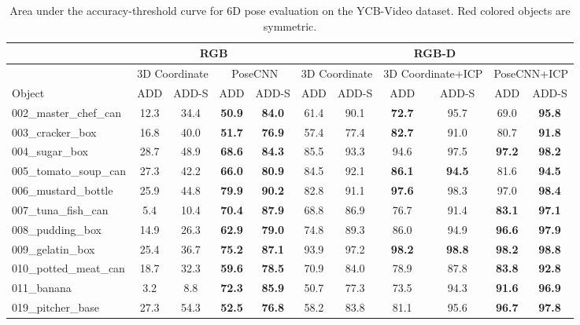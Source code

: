 \documentclass[conference]{IEEEtran}
\begin{document}
\begin{table*}
	\centering
	\caption{Area under the accuracy-threshold curve for 6D pose evaluation on the YCB-Video dataset. Red colored objects are symmetric.}
	\label{table:ycb}
	\begin{tabular}{|l|c|c|c|c||c|c|c|c|c|c|}
		\hline  & \multicolumn{4}{c||}{RGB} & \multicolumn{6}{c|}{RGB-D} \\
		\hline  & \multicolumn{2}{c|}{3D Coordinate}  & \multicolumn{2}{c||}{PoseCNN} & \multicolumn{2}{c|}{3D Coordinate} & \multicolumn{2}{c|}{3D Coordinate+ICP} & \multicolumn{2}{c|}{PoseCNN+ICP} \\
		\hline  Object & ADD & ADD-S & ADD & ADD-S & ADD & ADD-S & ADD  & ADD-S & ADD & ADD-S \\
		\hline 002\_master\_chef\_can & 12.3 & 34.4 &	\textbf{50.9} & \textbf{84.0} & 61.4 & 90.1  & \textbf{72.7} & 95.7 & 69.0 & \textbf{95.8} \\
		\hline 003\_cracker\_box & 16.8 & 40.0 & \textbf{51.7} & \textbf{76.9} & 57.4 & 77.4 & \textbf{82.7} & 91.0  & 80.7 & \textbf{91.8} \\
		\hline 004\_sugar\_box & 28.7 & 48.9 & \textbf{68.6} & \textbf{84.3} & 85.5 & 93.3 & 94.6 & 97.5 & \textbf{97.2} & \textbf{98.2} \\
		\hline 005\_tomato\_soup\_can & 27.3 & 42.2 &	\textbf{66.0} & \textbf{80.9} & 84.5 & 92.1 &	\textbf{86.1} & \textbf{94.5} & 81.6 & \textbf{94.5} \\
		\hline 006\_mustard\_bottle & 25.9 & 44.8 & \textbf{79.9} & \textbf{90.2} & 82.8 & 91.1 & \textbf{97.6} & 98.3 & 97.0 & \textbf{98.4} \\
		\hline 007\_tuna\_fish\_can & 5.4 & 10.4 & \textbf{70.4} & \textbf{87.9} & 68.8 & 86.9 & 76.7 & 91.4 & \textbf{83.1} & \textbf{97.1} \\
		\hline 008\_pudding\_box & 14.9 & 26.3 & \textbf{62.9} & \textbf{79.0} & 74.8 & 89.3 & 86.0 & 94.9 & \textbf{96.6} & \textbf{97.9} \\
		\hline 009\_gelatin\_box & 25.4 & 36.7 & \textbf{75.2} & \textbf{87.1} & 93.9 & 97.2 & \textbf{98.2} & \textbf{98.8} & \textbf{98.2} & \textbf{98.8} \\
		\hline 010\_potted\_meat\_can & 18.7 & 32.3 & \textbf{59.6} & \textbf{78.5} & 70.9 & 84.0 & 78.9 & 87.8 & \textbf{83.8} & \textbf{92.8} \\
		\hline 011\_banana & 3.2 & 8.8 & \textbf{72.3} & \textbf{85.9} & 50.7 & 77.3 & 73.5 & 94.3 & \textbf{91.6} & \textbf{96.9} \\
		\hline 019\_pitcher\_base & 27.3 & 54.3 & \textbf{52.5} & \textbf{76.8} & 58.2 & 83.8 & 81.1 & 95.6 & \textbf{96.7} & \textbf{97.8} \\

\end{tabular}
\end{table*}
\end{document}
